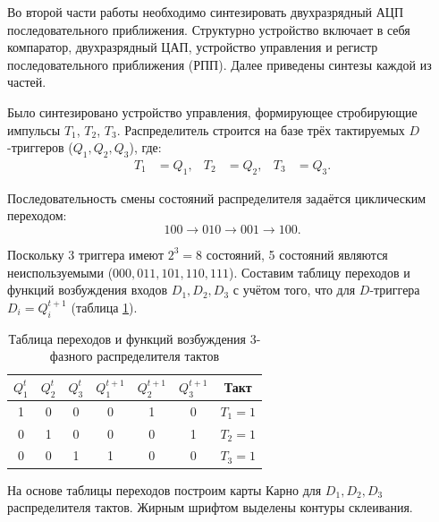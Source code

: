 \documentclass[14pt, a4paper]{extarticle}
\begin{document}
	Во второй части работы необходимо синтезировать двухразрядный АЦП последовательного приближения. Структурно устройство включает в себя компаратор, двухразрядный ЦАП, устройство управления и регистр последовательного приближения (РПП). Далее приведены синтезы каждой из частей.
	
	Было синтезировано устройство управления, формирующее стробирующие импульсы $T_1$, $T_2$, $T_3$. Распределитель строится на базе трёх тактируемых $D$-триггеров ($Q_1, Q_2, Q_3$), где:
	\begin{align*}
		T_1 &= Q_1, & T_2 &= Q_2, & T_3 &= Q_3.
	\end{align*}
	
	Последовательность смены состояний распределителя задаётся циклическим переходом:
	\begin{equation*}
		100 \longrightarrow 010 \longrightarrow 001 \longrightarrow 100.
	\end{equation*}
	
	Поскольку 3 триггера имеют $2^3 = 8$ состояний, 5 состояний являются неиспользуемыми ($000, 011, 101, 110, 111$). Составим таблицу переходов и функций возбуждения входов $D_1, D_2, D_3$ с учётом того, что для $D$-триггера $D_i = Q_i^{t+1}$ (таблица \ref{tab:distr_trans}).
	
	\begin{table}[H]
		\centering
		\begin{tabular}{|c|c|c|c|c|c|c|}
			\hline
			$Q_1^t$ & $Q_2^t$ & $Q_3^t$ & $Q_1^{t+1}$ & $Q_2^{t+1}$ & $Q_3^{t+1}$ & Такт \\ \hline
			1 & 0 & 0 & 0 & 1 & 0 & $T_1 = 1$ \\ \hline
			0 & 1 & 0 & 0 & 0 & 1 & $T_2 = 1$ \\ \hline
			0 & 0 & 1 & 1 & 0 & 0 & $T_3 = 1$ \\ \hline
		\end{tabular}
		\caption{Таблица переходов и функций возбуждения 3-фазного распределителя тактов}
		\label{tab:distr_trans}
	\end{table}
	
	На основе таблицы переходов построим карты Карно для $D_1, D_2, D_3$ распределителя тактов. Жирным шрифтом выделены контуры склеивания.
	
\end{document}
